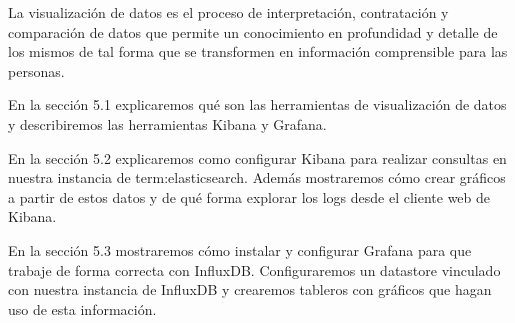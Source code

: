 La visualización de datos es el proceso de interpretación, contratación y comparación de datos que permite un conocimiento en profundidad y detalle de los mismos de tal forma que se transformen en información comprensible para las personas.

En la sección 5.1 explicaremos qué son las herramientas de visualización de datos y describiremos las herramientas Kibana y Grafana.

En la sección 5.2 explicaremos como configurar Kibana para realizar consultas en nuestra instancia de \gls{term:elasticsearch}. Además mostraremos cómo crear gráficos a partir de estos datos y de qué forma explorar los logs desde el cliente web de Kibana.

En la sección 5.3 mostraremos cómo instalar y configurar Grafana para que trabaje de forma correcta con InfluxDB. Configuraremos un datastore vinculado con nuestra instancia de InfluxDB y crearemos tableros con gráficos que hagan uso de esta información.

